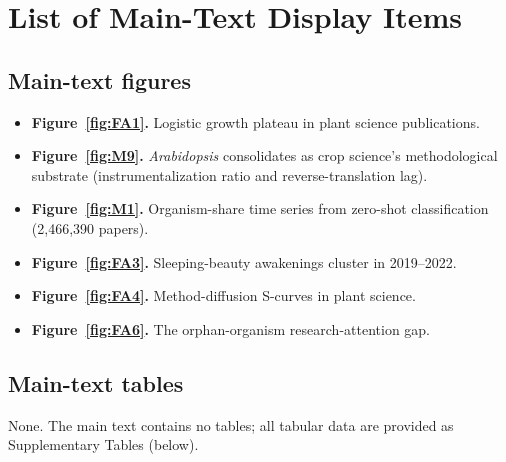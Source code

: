 
\section*{List of Main-Text Display Items}

\subsection*{Main-text figures}
\begin{itemize}\setlength{\itemsep}{2pt}

\item \textbf{Figure~\ref{fig:FA1}.} Logistic growth plateau in plant
        science publications.
\item \textbf{Figure~\ref{fig:M9}.} \textit{Arabidopsis} consolidates as
        crop science's methodological substrate (instrumentalization ratio
        and reverse-translation lag).
\item \textbf{Figure~\ref{fig:M1}.} Organism-share time series from
        zero-shot classification (2,466,390 papers).
\item \textbf{Figure~\ref{fig:FA3}.} Sleeping-beauty awakenings cluster in
        2019--2022.
\item \textbf{Figure~\ref{fig:FA4}.} Method-diffusion S-curves in plant
        science.
\item \textbf{Figure~\ref{fig:FA6}.} The orphan-organism
        research-attention gap.
\end{itemize}

\subsection*{Main-text tables}
None. The main text contains no tables; all tabular data are provided as
Supplementary Tables (below).

